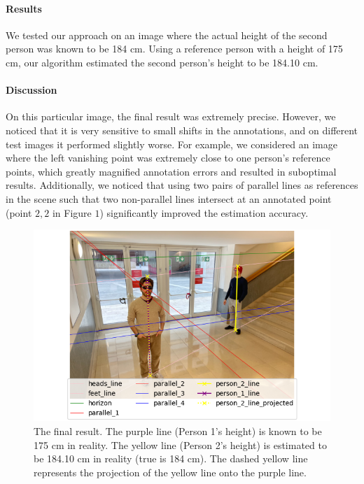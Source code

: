 \paragraph{Results} We tested our approach on an image where the actual height of the second person was known to be 184 cm. Using a reference person with a height of 175 cm, our algorithm estimated the second person's height to be 184.10 cm.

\paragraph{Discussion} On this particular image, the final result was extremely precise. However, we noticed that it is very sensitive to small shifts in the annotations, and on different test images it performed slightly worse. For example, we considered an image where the left vanishing point was extremely close to one person's reference points, which greatly magnified annotation errors and resulted in suboptimal results. Additionally, we noticed that using two pairs of parallel lines as references in the scene such that two non-parallel lines intersect at an annotated point (point $2,2$ in Figure $1$) significantly improved the estimation accuracy.  

\begin{figure}
    \centering
    \includegraphics[width=0.5\linewidth]{img/final.png}
    \caption{The final result. The purple line (Person 1's height) is known to be 175 cm in reality. The yellow line (Person 2's height) is estimated to be 184.10 cm in reality (true is 184 cm). The dashed yellow line represents the projection of the yellow line onto the purple line.}
    \label{fig:final}
\end{figure}
